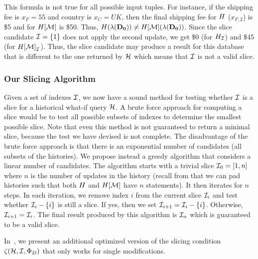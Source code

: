 \begin{exam}
This formula is not true for all possible input tuples. For instance, if the shipping fee is $x_{F} = 55$ and country is $x_{C} = UK$, then the final shipping fee for $H$ ($x_{F,2}$) is \$5 and for $H[\mathcal{M}]$ is \$50. Thus, $H(\lambda(\mathbf{D_0})) \neq H[\mathcal{M}](\lambda(\mathbf{D_0}))$. Since the slice candidate $\mathcal{I} = \{1\}$ does not apply the second update, we get \$0 (for $H_{\mathcal{I}}$) and \$45 (for ${H[\mathcal{M}]}_{\mathcal{I}}$). Thus, the slice candidate may produce a  result for this database that is different to the one returned by $\mathcal{H}$ which means that $\mathcal{I}$ is not a valid slice.
\end{exam}



\subsubsection{Our Slicing Algorithm}
\label{sec:finding-slice}
%
Given a set of indexes $\mathcal{I}$, we now have a sound method for testing whether $\mathcal{I}$ is a slice for a historical what-if query $\mathcal{H}$. A brute force approach for computing a slice would be to test all possible subsets of indexes to determine the smallest possible slice. Note that even this method is not guaranteed to return a minimal slice, because the test we have devised is not complete. The disadvantage of the brute force approach is that there is an exponential number of candidates (all subsets of the histories). We propose instead a greedy algorithm that considers a linear number of candidates. The algorithm starts with a trivial slice $\mathcal{I}_{0} = [1,n]$ where $n$ is the number of updates in the history (recall from  that we can pad histories such that both $H$ and $H[\mathcal{M}]$ have $n$ statements). It then iterates for $n$ steps. In each iteration, we remove index $i$ from the current slice $\mathcal{I}_{i}$ and test whether $\mathcal{I}_{i} - \{i\}$ is still a slice. If yes, then we set $\mathcal{I}_{i+1} = \mathcal{I}_{i} - \{i\}$. Otherwise, $\mathcal{I}_{i+1} = \mathcal{I}_{i}$. The final result produced by this algorithm is $\mathcal{I}_{n}$ which is guaranteed to be a valid slice.


In~\cite{techreport}, we present an additional optimized version of the slicing condition $\zeta({\mathcal{H}},{\mathcal{I}},{\Phi_{D}})$  that only works for single modifications.

